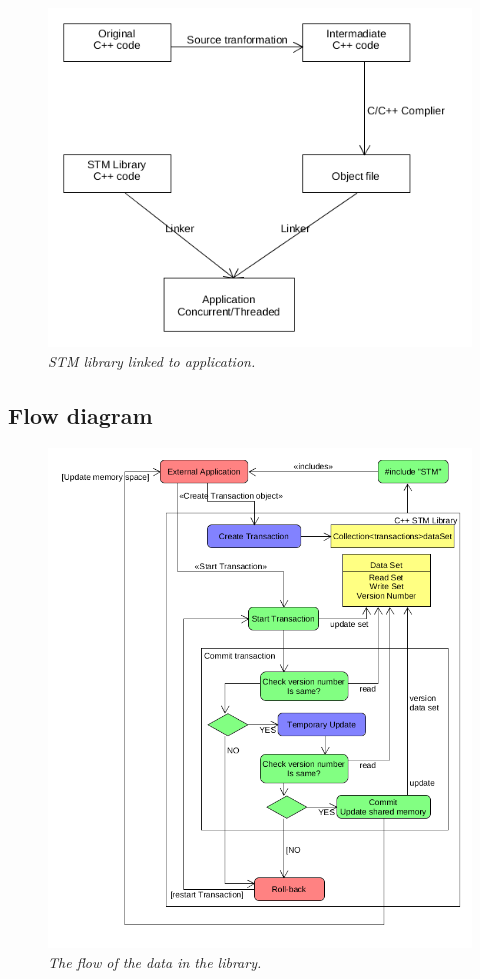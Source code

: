\documentclass[12pt]{article}
\begin{document}
\begin{figure}[h!]
\centering
\includegraphics[scale=0.5]{Pictures/transformation.png}
\caption{\textit{\color{gray}STM library linked to application.}}
\end{figure}

\newpage
\subsection{Flow diagram}
\begin{figure}[h!]
\centering
\includegraphics[scale=0.5]{Pictures/flowDiagram.png}
\caption{\textit{\color{gray}The flow of the data in the library.}}
\end{figure}
\end{document}
